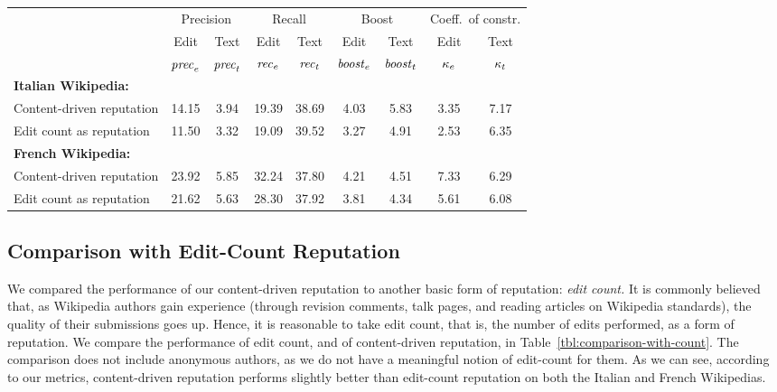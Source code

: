 \begin{table*}
\begin{center}
\begin{tabular}{|l||c|c||c|c||c|c||c|c|} \hline
 & \multicolumn{2}{|c||}{Precision}
 & \multicolumn{2}{|c||}{Recall}
 & \multicolumn{2}{|c||}{Boost}
 & \multicolumn{2}{|c|}{Coeff.\ of constr.} \\
 & Edit & Text & Edit & Text  & Edit & Text & Edit & Text \\
 & ${\text{\textit{prec}}}_e$ & ${\text{\textit{prec}}}_t$ & ${\text{\textit{rec}}}_e$ & ${\text{\textit{rec}}}_t$ & ${\text{\textit{boost}}}_e$ & ${\text{\textit{boost}}}_t$ 
 & $\kappa_e$ & $\kappa_t$ \\[0.5ex] \hline 
\textbf{Italian Wikipedia:} & & & & & & & & \\
\qquad Content-driven reputation & 14.15 &  3.94 & 19.39 & 38.69 & 4.03 & 5.83 & 3.35 & 7.17 \\
\qquad Edit count as reputation  & 11.50 &  3.32 & 19.09 & 39.52 & 3.27 & 4.91 & 2.53 & 6.35 \\ \hline
\textbf{French Wikipedia:} & & & & & & & & \\
\qquad Content-driven reputation & 23.92 &  5.85 & 32.24 & 37.80 & 4.21 & 4.51 & 7.33 & 6.29 \\
\qquad Edit count as reputation &  21.62 &  5.63 & 28.30 & 37.92 & 3.81 & 4.34 & 5.61 & 6.08 \\ \hline
\end{tabular}
\end{center}
\caption{Summary of the performance of content-driven reputation over
the Italian and French Wikipedias. All data are expressed as
percentages. Anonymous authors are not included in the comparison.}
\label{tbl:comparison-with-count} 
\end{table*}



\subsection{Comparison with Edit-Count Reputation}

We compared the performance of our content-driven reputation to 
another basic form of reputation: {\em edit count.} 
It is commonly believed that, as Wikipedia authors gain experience
(through revision comments, talk pages, and reading articles on
Wikipedia standards), the quality of their submissions goes up.
Hence, it is reasonable to take edit count, that is, the number of
edits performed, as a form of reputation. 
We compare the performance of edit count, and of content-driven
reputation, in Table~\ref{tbl:comparison-with-count}. 
The comparison does not include anonymous authors, as we do not have a
meaningful notion of edit-count for them. 
As we can see, according to our metrics, content-driven reputation
performs slightly better than edit-count reputation on both the Italian 
and French Wikipedias. 

